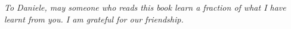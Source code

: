 \cleardoublepage
\thispagestyle{empty}
\begin{center}
\Large\itshape
To Daniele, may someone who reads this book learn a fraction of what I have
learnt from you. I am grateful for our friendship.
\end{center}
